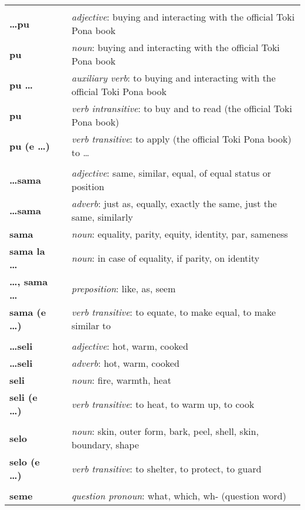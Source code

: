 \begin{supertabular}{p{2,5cm}|ll}
 && \\ %
\textbf{\dots pu} && \textit{adjective}: buying and interacting with the official Toki Pona book \\ 
\textbf{pu} && \textit{noun}: buying and interacting with the official Toki Pona book \\ 
\textbf{pu \dots} && \textit{auxiliary verb}: to buying and interacting with the official Toki Pona book \\ 
\textbf{pu} && \textit{verb intransitive}:  to buy and to read (the official Toki Pona book) \\
\textbf{pu (e \dots)} && \textit{verb transitive}: to apply (the official Toki Pona book) to \dots \\
 && \\ %
\textbf{\dots sama} && \textit{adjective}: same, similar, equal, of equal status or position \\ 
\textbf{\dots sama} && \textit{adverb}: just as, equally, exactly the same, just the same, similarly \\ 
\textbf{sama} && \textit{noun}: equality, parity, equity, identity, par, sameness \\ 
\textbf{sama la \dots} && \textit{noun}: in case of equality, if parity, on identity  \\ 
\textbf{\dots , sama \dots} && \textit{preposition}: like, as, seem \\ 
\textbf{sama (e \dots)} && \textit{verb transitive}: to equate, to make equal, to make similar to \\ 
 && \\ %
\textbf{\dots seli} && \textit{adjective}: hot, warm, cooked \\ 
\textbf{\dots seli} && \textit{adverb}: hot, warm, cooked \\ 
\textbf{seli} && \textit{noun}: fire, warmth, heat \\ 
\textbf{seli (e \dots)} && \textit{verb transitive}: to heat, to warm up, to cook \\ 
 && \\ %
\textbf{selo} && \textit{noun}: skin, outer form, bark, peel, shell, skin, boundary, shape \\ 
\textbf{selo (e \dots)} && \textit{verb transitive}: to shelter, to protect, to guard \\ 
 && \\ %
\textbf{seme} && \textit{question pronoun}: what, which, wh- (question word) \\ 

\end{supertabular}

